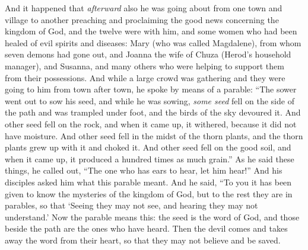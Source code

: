 \begin{biblechapter} %
 And it happened that \textit{afterward} also he was going about from one town and village to another preaching and proclaiming the good news concerning the kingdom of God, and the twelve were with him,
\verse and some women who had been healed of evil spirits and diseases: Mary (who was called Magdalene), from whom seven demons had gone out,
\verse and Joanna the wife of Chuza (Herod’s household manager), and Susanna, and many others who were helping to support them from their possessions.
 And while a large crowd was gathering and they were going to him from town after town, he spoke by means of a parable:
\verse “The sower went out to sow his seed, and while he was sowing, \textit{some seed} fell on the side of the path and was trampled under foot, and the birds of the sky devoured it.
\verse And other seed fell on the rock, and when it came up, it withered, because it did not have moisture.
\verse And other seed fell in the midst of the thorn plants, and the thorn plants grew up with it and choked it.
\verse And other seed fell on the good soil, and when it came up, it produced a hundred times as much grain.” As he said these things, he called out, “The one who has ears to hear, let him hear!”
 And his disciples asked him what this parable meant.
\verse And he said, “To you it has been given to know the mysteries of the kingdom of God, but to the rest they are in parables, so that ‘Seeing they may not see, 
and hearing they may not understand.’
 Now the parable means this: the seed is the word of God,
\verse and those beside the path are the ones who have heard. Then the devil comes and takes away the word from their heart, so that they may not believe and be saved.

\end{biblechapter}
